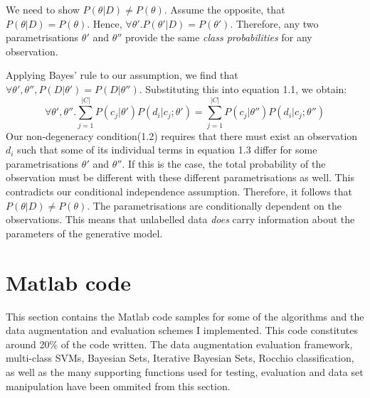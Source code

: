 \documentclass[12pt,twoside,notitlepage,amsart]{report} %
\begin{document}
	We need to show $P(\theta|D) \neq P(\theta)$. Assume the opposite, that $P(\theta|D) = P(\theta)$. Hence, $ \forall \theta'. P(\theta'|D) = P(\theta')$. Therefore, any two parametrisations $\theta'$ and $\theta''$ provide the same \emph{class probabilities} for any observation. 
	
	Applying Bayes' rule to our assumption, we find that $\forall \theta', \theta'', P(D|\theta') = P(D|\theta'')$. Substituting this into equation 1.1, we obtain: \begin{equation} \forall \theta', \theta''. \sum\limits_{j=1}^{\left|C\right|} P(c_j|\theta') P(d_i|c_j; \theta') = \sum\limits_{j=1}^{\left|C\right|} P(c_j|\theta'') P(d_i|c_j; \theta'') \end{equation} 
	Our non-degeneracy condition(1.2) requires that there must exist an observation $d_i$ such that some of its individual terms in equation 1.3 differ for some parametrisations $\theta'$ and $\theta''$. If this is the case, the total probability of the observation must be different with these different parametrisations as well. This contradicts our conditional independence assumption. Therefore, it follows that $P(\theta|D) \neq P(\theta)$. The parametrisations are conditionally dependent on the observations. This means that unlabelled data \emph{does} carry information about the parameters of the generative model.\\

	\chapter{Matlab code}
	
	This section contains the Matlab code samples for some of the algorithms and the data augmentation and evaluation schemes I implemented. This code constitutes around 20\% of the code written. The data augmentation evaluation framework, multi-class SVMs, Bayesian Sets, Iterative Bayesian Sets, Rocchio classification, as well as the many supporting functions used for testing, evaluation and data set manipulation have been ommited from this section. 
	
\end{document}
